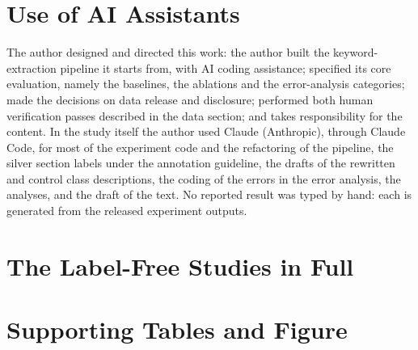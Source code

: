 \documentclass[11pt]{article}
\begin{document}
\section*{Use of AI Assistants}

The author designed and directed this work: the author built the
keyword-extraction pipeline it starts from, with AI coding assistance; specified
its core evaluation, namely the baselines, the ablations and the error-analysis
categories; made the decisions on data release and disclosure; performed both
human verification passes described in the data section; and takes
responsibility for the content. In the study itself the author used Claude
(Anthropic), through Claude Code, for most of the experiment code and the
refactoring of the pipeline, the silver section labels under the annotation
guideline, the drafts of the rewritten and control class descriptions, the
coding of the errors in the error analysis, the analyses, and the draft of the
text.
No reported result was typed by hand: each is generated from the released
experiment outputs.




\appendix

\section{The Label-Free Studies in Full}
\label{app:labelfree}



\section{Supporting Tables and Figure}
\label{app:supporting}









\end{document}
